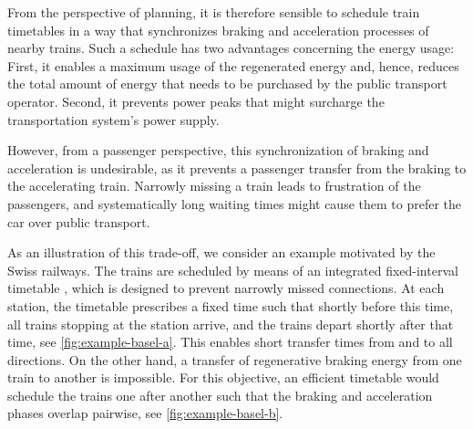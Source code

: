 \documentclass[11pt,a4paper]{article}
\theoremstyle{definition}
\theoremstyle{remark}
\begin{document}
From the perspective of planning, it is therefore sensible to schedule train timetables in a way that synchronizes braking and acceleration processes of nearby trains. Such a schedule has two advantages concerning the energy usage: First, it enables a maximum usage of the regenerated energy and, hence, reduces the total amount of energy that needs to be purchased by the public transport operator. Second, it prevents power peaks that might surcharge the transportation system's power supply.

However, from a passenger perspective, this synchronization of braking and acceleration is undesirable, as it prevents a passenger transfer from the braking to the accelerating train. Narrowly missing a train leads to frustration of the passengers, and systematically long waiting times might cause them to prefer the car over public transport.

As an illustration of this trade-off, we consider an example motivated by the Swiss railways. The trains are scheduled by means of an integrated fixed-interval timetable \cite{KräuchiChristian2004MZfd}, which is designed to prevent narrowly missed connections. At each station, the timetable prescribes a fixed time such that shortly before this time, all trains stopping at the station arrive, and the trains depart shortly after that time, see \cref{fig:example-basel-a}. This enables short transfer times from and to all directions. On the other hand, a transfer of regenerative braking energy from one train to another is impossible. For this objective, an efficient timetable would schedule the trains one after another such that the braking and acceleration phases overlap pairwise, see \cref{fig:example-basel-b}.
\end{document}

